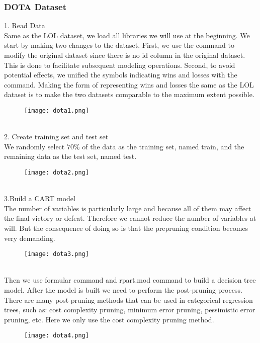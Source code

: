 \documentclass[a4paper,fleqn]{cas-sc}
\begin{document}
\subsubsection{DOTA Dataset}
 1. Read Data\\
Same as the LOL dataset, we load all libraries we will use at the beginning. We start by making two changes to the dataset. First, we use the command to modify the original dataset since there is no id column in the original dataset. This is done to facilitate subsequent modeling operations. Second, to avoid potential effects, we unified the symbols indicating wins and losses with the command. Making the form of representing wins and losses the same as the LOL dataset is to make the two datasets comparable to the maximum extent possible.\\
\begin{figure}[h!]
	\centering
		\texttt{[image: dota1.png]}
	\caption{}
	\label{FIG:1}
\end{figure}\\
2. Create training set and test set\\
We randomly select $70 \%$ of the data as the training set, named train, and the remaining data as the test set, named test.\\
\begin{figure}[h!]
	\centering
		\texttt{[image: dota2.png]}
	\caption{}
	\label{FIG:1}
\end{figure}\\
3.Build a CART model\\
The number of variables is particularly large and because all of them may affect the final victory or defeat. Therefore we cannot reduce the number of variables at will. But the consequence of doing so is that the prepruning condition becomes very demanding.\\
\begin{figure}[h!]
	\centering
		\texttt{[image: dota3.png]}
	\caption{}
	\label{FIG:1}
\end{figure}\\
Then we use formular command and rpart.mod command to build a decision tree model. After the model is built we need to perform the post-pruning process. There are many post-pruning methods that can be used in categorical regression trees, such as: cost complexity pruning, minimum error pruning, pessimistic error pruning, etc. Here we only use the cost complexity pruning method.\\
\begin{figure}[h!]
	\centering
		\texttt{[image: dota4.png]}
	\caption{}
	\label{FIG:1}
\end{figure}\\
\end{document}
